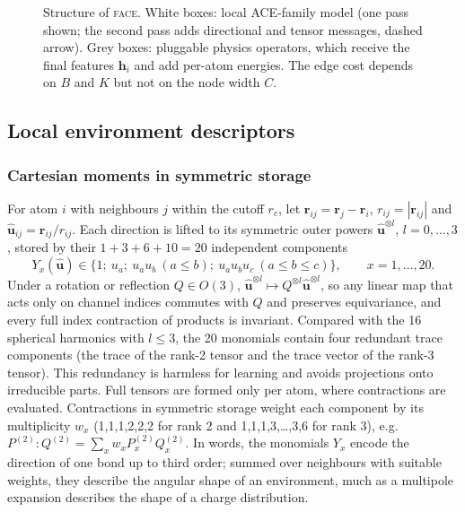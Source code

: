 \documentclass[journal=jctcce,manuscript=article,layout=traditional]{achemso}
\newcommand{\vect}[1]{\bm{#1}}
\newcommand{\FACE}{\textup{\textsc{face}}}
\begin{document}
\begin{figure}
\caption{Structure of \FACE{}. White boxes: local ACE-family model (one pass shown; the second pass adds directional
and tensor messages, dashed arrow). Grey boxes: pluggable physics operators, which receive the final features $\vect h_i$ and
add per-atom energies. The edge cost depends on $B$ and $K$ but not on the node width $C$.}
\label{fig:arch}
\end{figure}

\subsection{Local environment descriptors}
\subsubsection{Cartesian moments in symmetric storage}
\label{sec:moments}
For atom $i$ with neighbours $j$ within the cutoff $r_c$, let $\vect r_{ij}=\vect r_j-\vect r_i$,
$r_{ij}=|\vect r_{ij}|$ and $\hat{\vect u}_{ij}=\vect r_{ij}/r_{ij}$. Each direction is lifted to its symmetric
outer powers $\hat{\vect u}^{\otimes l}$, $l=0,\dots,3$, stored by their $1+3+6+10=20$ independent components
\begin{equation}
Y_x(\hat{\vect u})\in\{1;\ u_a;\ u_au_b\ (a\le b);\ u_au_bu_c\ (a\le b\le c)\},\qquad x=1,\dots,20.
\label{eq:monomials}
\end{equation}
Under a rotation or reflection $Q\in O(3)$, $\hat{\vect u}^{\otimes l}\mapsto Q^{\otimes l}\hat{\vect u}^{\otimes l}$,
so any linear map that acts only on channel indices commutes with $Q$ and preserves equivariance, and every full
index contraction of products is invariant. Compared with the 16 spherical harmonics with $l\le3$, the 20 monomials
contain four redundant trace components (the trace of the rank-2 tensor and the trace vector of the rank-3 tensor).
This redundancy is harmless for learning and avoids projections onto irreducible parts. Full tensors are formed only
per atom, where contractions are evaluated. Contractions in symmetric storage weight each component by its
multiplicity $w_x$ (1,1,1,2,2,2 for rank 2 and 1,1,1,3,\dots,3,6 for rank 3), e.g.\
$P^{(2)}\!:\!Q^{(2)}=\sum_xw_xP^{(2)}_xQ^{(2)}_x$. In words, the monomials $Y_x$ encode the direction of one bond up
to third order; summed over neighbours with suitable weights, they describe the angular shape of an environment, much
as a multipole expansion describes the shape of a charge distribution.
\end{document}
